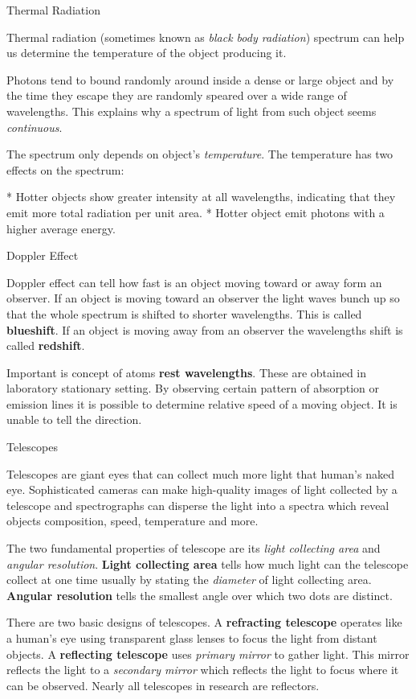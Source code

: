 \sec Thermal Radiation

Thermal radiation (sometimes known as {\em black body radiation}) spectrum can
help us determine the temperature of the object producing it.

Photons tend to bound randomly around inside a dense or large object and by
the time they escape they are randomly speared over a wide range of wavelengths.
This explains why a spectrum of light from such object seems {\em continuous}.

The spectrum only depends on object's {\em temperature}. The temperature has
two effects on the spectrum:

\begitems
* Hotter objects show greater intensity at all wavelengths, indicating that
they emit more total radiation per unit area.
* Hotter object emit photons with a higher average energy.
\enditems

\sec Doppler Effect

Doppler effect can tell how fast is an object moving toward or away form
an observer. If an object is moving toward an observer the light waves bunch
up so that the whole spectrum is shifted to shorter wavelengths. This is called
{\bf blueshift}. If an object is moving away from an observer the wavelengths
shift is called {\bf redshift}.

Important is concept of atoms {\bf rest wavelengths}. These are obtained
in laboratory stationary setting. By observing certain pattern of absorption
or emission lines it is possible to determine relative speed of a moving
object. It is unable to tell the direction.

\sec Telescopes

Telescopes are giant eyes that can collect much more light that human's naked
eye. Sophisticated cameras can make high-quality images of light collected
by a telescope and spectrographs can disperse the light into a spectra which
reveal objects composition, speed, temperature and more.

The two fundamental properties of telescope are its {\em light collecting area}
and {\em angular resolution}. {\bf Light collecting area} tells how much light
can the telescope collect at one time usually by stating the {\em diameter} of
light collecting area. {\bf Angular resolution} tells the smallest angle over
which two dots are distinct.

There are two basic designs of telescopes. A {\bf refracting telescope}
operates like a human's eye using transparent glass lenses to focus the light
from distant objects. A {\bf reflecting telescope} uses {\em primary mirror} to
gather light. This mirror reflects the light to a {\em secondary mirror} which
reflects the light to focus where it can be observed. Nearly all telescopes
in research are reflectors.

